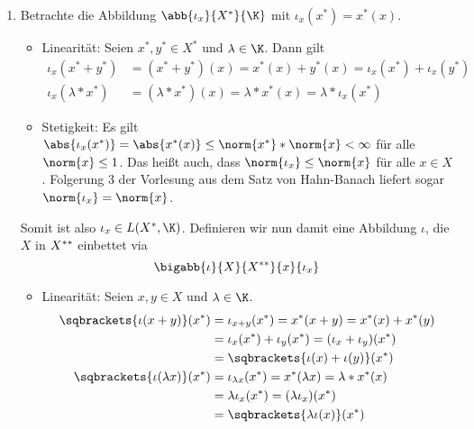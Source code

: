 \begin{exercisePage}
 	\begin{enumerate}[label=(zu \alph*), leftmargin=*]
 		\item Betrachte die Abbildung $\abb{\iota_x}{X^\ast}{\K}$ mit $\iota_x(x^\ast) = x^\ast(x)$.
 		\begin{itemize}
 			\item Linearität: Seien $x^\ast, y^\ast \in X^\ast$ und $\lambda \in \K$. Dann gilt
 			\begin{equation*}
 				\begin{aligned}
 				\iota_x(x^\ast + y^\ast) &= (x^\ast + y^\ast)(x) = x^\ast(x) + y^\ast(x) = \iota_x(x^\ast) + \iota_x(y^\ast) \\
 				\iota_x(\lambda*x^\ast) &= (\lambda * x^\ast)(x) = \lambda * x^\ast(x) = \lambda * \iota_x(x^\ast)
 				\end{aligned}
 			\end{equation*}
 			\item Stetigkeit: Es gilt $\abs{\iota_x(x^\ast)} = \abs{x^\ast(x)} \le \norm{x^\ast} * \norm{x} < \infty$ für alle $\norm{x} \le 1$. Das heißt auch, dass $\norm{\iota_x} \le \norm{x}$ für alle $x \in X$. Folgerung 3 der Vorlesung aus dem Satz von Hahn-Banach liefert sogar $\norm{\iota_x} = \norm{x}$.
 		\end{itemize}
 		Somit ist also $\iota_x \in L(X^\ast, \K)$.
 		Definieren wir nun damit eine Abbildung $\iota$, die $X$ in $X^{\ast\ast}$ einbettet via
 		\begin{equation*}
 			\bigabb{\iota}{X}{X^\dast}{x}{\iota_x}
 		\end{equation*}
 		\begin{itemize}
 			\item Linearität: Seien $x,y \in X$ und $\lambda \in \K$.
 			\begin{equation*}
 				\begin{aligned}
 				\sqbrackets{\iota(x+y)}(x^\ast) 
 				&= \iota_{x+y}(x^\ast) 
 				= x^\ast(x+y) 
 				= x^\ast(x) + x^\ast(y) \\
 				&= \iota_x(x^\ast) + \iota_y(x^\ast) 
 				= (\iota_x + \iota_y) (x^\ast) \\
 				&= \sqbrackets{\iota(x) + \iota(y)}(x^\ast) \\
 				\sqbrackets{\iota(\lambda x)}(x^\ast) 
 				&= \iota_{\lambda x}(x^\ast) 
 				= x^\ast(\lambda x) 
 				= \lambda * x^\ast(x) \\
 				&= \lambda \iota_x(x^\ast) 
 				= (\lambda \iota_x)(x^\ast) \\
 				&= \sqbrackets{\lambda \iota(x)}(x^\ast)

\end{aligned}
\end{equation*}
\end{itemize}
\end{enumerate}
\end{exercisePage}
